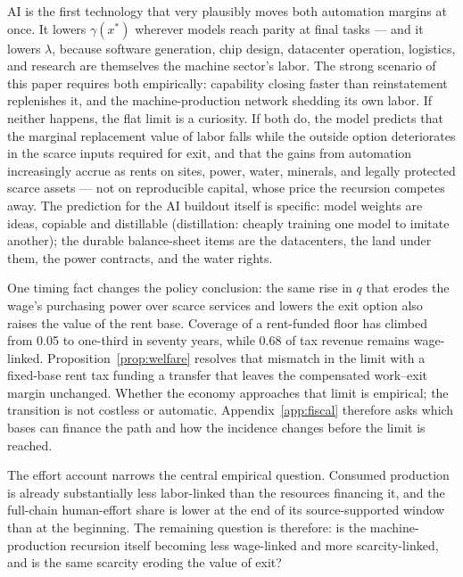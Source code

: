 \documentclass[12pt]{article}
\theoremstyle{plain}
\begin{document}
AI is the first technology that very plausibly moves both automation margins at once. It lowers $\gamma (x^*)$ wherever models reach parity at final tasks --- and it lowers $\lambda$, because software generation, chip design, datacenter operation, logistics, and research are themselves the machine sector's labor. The strong scenario of this paper requires both empirically: capability closing faster than reinstatement replenishes it, and the machine-production network shedding its own labor. If neither happens, the flat limit is a curiosity. If both do, the model predicts that the marginal replacement value of labor falls while the outside option deteriorates in the scarce inputs required for exit, and that the gains from automation increasingly accrue as rents on sites, power, water, minerals, and legally protected scarce assets --- not on reproducible capital, whose price the recursion competes away. The prediction for the AI buildout itself is specific: model weights are ideas, copiable and distillable (distillation: cheaply training one model to imitate another); the durable balance-sheet items are the datacenters, the land under them, the power contracts, and the water rights.

One timing fact changes the policy conclusion: the same rise in $q$ that erodes the wage's purchasing power over scarce services and lowers the exit option also raises the value of the rent base. Coverage of a rent-funded floor has climbed from 0.05 to one-third in seventy years, while 0.68 of tax revenue remains wage-linked. Proposition~\ref{prop:welfare} resolves that mismatch in the limit with a fixed-base rent tax funding a transfer that leaves the compensated work--exit margin unchanged. Whether the economy approaches that limit is empirical; the transition is not costless or automatic. Appendix~\ref{app:fiscal} therefore asks which bases can finance the path and how the incidence changes before the limit is reached.

The effort account narrows the central empirical question. Consumed production is already substantially less labor-linked than the resources financing it, and the full-chain human-effort share is lower at the end of its source-supported window than at the beginning. The remaining question is therefore: is the machine-production recursion itself becoming less wage-linked and more scarcity-linked, and is the same scarcity eroding the value of exit?

\appendix
{}
\end{document}
